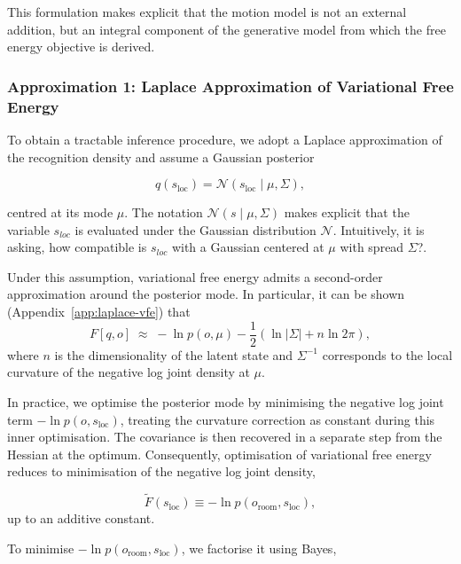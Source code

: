 \documentclass[a4paper, twoside]{article}
\begin{document}
This formulation makes explicit that the motion model is not an external addition, but an integral component of the generative model from which the free energy objective is derived.



\subsubsection{Approximation 1: Laplace Approximation of Variational Free Energy}
\label{sec:laplace-main}

To obtain a tractable inference procedure, we adopt a Laplace approximation of
the recognition density and assume a Gaussian posterior

\begin{equation}
    q(s_{\text{loc}}) = \mathcal{N}(s_{\text{loc}} \mid \mu, \Sigma),
\end{equation}

centred at its mode $\mu$. The notation $\mathcal{N}(s \mid \mu, \Sigma)$ makes explicit that the variable $s_{loc}$ is evaluated under the Gaussian distribution $\mathcal{N}$. Intuitively, it is asking, how compatible is $s_{loc}$ with a Gaussian centered at $\mu$ with spread $\Sigma$?.

Under this assumption, variational free energy admits
a second-order approximation around the posterior mode. In particular, it can be
shown (Appendix~\ref{app:laplace-vfe}) that
\begin{equation}
F[q,o]
\;\approx\;
-\ln p(o,\mu)
-\frac{1}{2}\left(\ln|\Sigma| + n\ln 2\pi\right),
\label{eq:vfe-laplace}
\end{equation}
where $n$ is the dimensionality of the latent state and $\Sigma^{-1}$ corresponds
to the local curvature of the negative log joint density at $\mu$.

In practice, we optimise the posterior mode by minimising the negative log joint term $-\ln p(o,s_{\text{loc}})$, treating the curvature correction as constant during this inner optimisation. The covariance is then recovered in a separate step from the Hessian at the optimum.
Consequently, optimisation of variational free energy reduces to minimisation of
the negative log joint density,

\begin{equation}
\tilde{F}(s_{\text{loc}}) \equiv -\ln p(o_{\text{room}}, s_{\text{loc}}),
\end{equation}
up to an additive constant.

To minimise $ -\ln p(o_{\text{room}}, s_{\text{loc}})$, we factorise it using Bayes,
\end{document}
